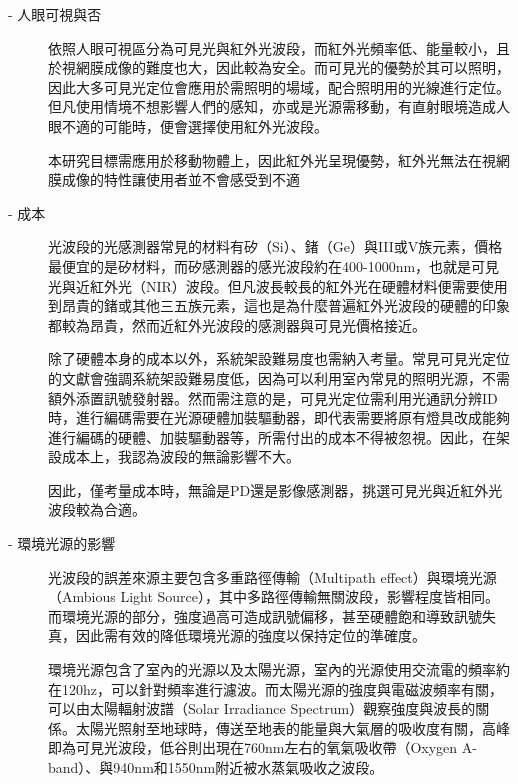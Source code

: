             \begin{description}

                \item[- 人眼可視與否]\hfill 
                
                \qquad
                依照人眼可視區分為可見光與紅外光波段，而紅外光頻率低、能量較小，且於視網膜成像的難度也大，因此較為安全。而可見光的優勢於其可以照明，因此大多可見光定位會應用於需照明的場域，配合照明用的光線進行定位。但凡使用情境不想影響人們的感知，亦或是光源需移動，有直射眼境造成人眼不適的可能時，便會選擇使用紅外光波段。

                \qquad 
                本研究目標需應用於移動物體上，因此紅外光呈現優勢，紅外光無法在視網膜成像的特性讓使用者並不會感受到不適

                \item[- 成本] \hfill 
                
                \qquad
                光波段的光感測器常見的材料有矽（Si）、鍺（Ge）與III或V族元素，價格最便宜的是矽材料，而矽感測器的感光波段約在400-1000nm，也就是可見光與近紅外光（NIR）波段。但凡波長較長的紅外光在硬體材料便需要使用到昂貴的鍺或其他三五族元素\cite{si_pd}，這也是為什麼普遍紅外光波段的硬體的印象都較為昂貴，然而近紅外光波段的感測器與可見光價格接近。

                \qquad
                除了硬體本身的成本以外，系統架設難易度也需納入考量。常見可見光定位的文獻會強調系統架設難易度低，因為可以利用室內常見的照明光源，不需額外添置訊號發射器。然而需注意的是，可見光定位需利用光通訊分辨ID時，進行編碼需要在光源硬體加裝驅動器，即代表需要將原有燈具改成能夠進行編碼的硬體、加裝驅動器等，所需付出的成本不得被忽視。因此，在架設成本上，我認為波段的無論影響不大。
                
                \qquad
                因此，僅考量成本時，無論是PD還是影像感測器，挑選可見光與近紅外光波段較為合適。
        
                \item[- 環境光源的影響] \hfill 
                
                \qquad
                光波段的誤差來源主要包含多重路徑傳輸（Multipath effect）與環境光源（Ambious Light Source）\cite{survey_light2020}，其中多路徑傳輸無關波段，影響程度皆相同。而環境光源的部分，強度過高可造成訊號偏移，甚至硬體飽和導致訊號失真，因此需有效的降低環境光源的強度以保持定位的準確度。
            

                \qquad
                環境光源包含了室內的光源以及太陽光源，室內的光源使用交流電的頻率約在120hz，可以針對頻率進行濾波。而太陽光源的強度與電磁波頻率有關，可以由太陽輻射波譜（Solar Irradiance Spectrum）觀察強度與波長的關係。太陽光照射至地球時，傳送至地表的能量與大氣層的吸收度有關，高峰即為可見光波段，低谷則出現在760nm左右的氧氣吸收帶（Oxygen A-band）、與940nm和1550nm附近被水蒸氣吸收之波段\cite{book:solar_spectrum}。
                

\end{description}

